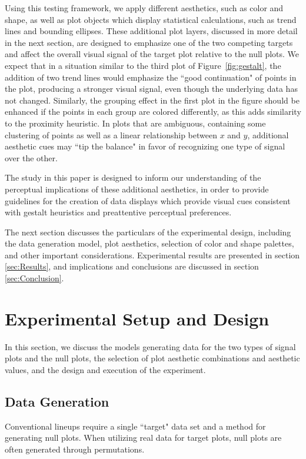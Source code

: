\documentclass[12pt]{article}\usepackage[]{graphicx}\usepackage[]{color}
\begin{document}
Using this testing framework, we  apply different aesthetics, such as color and shape, as well as plot objects which display statistical calculations, such as trend lines and bounding ellipses. These additional plot layers, discussed in more detail in the next section, are designed to emphasize one of the two competing targets and affect the overall visual signal of the target plot relative to the null plots. We expect that in a situation similar to the third plot of Figure~\ref{fig:gestalt}, the addition of two trend lines would emphasize the ``good continuation" of points in the plot, producing a stronger visual signal, even though the underlying data has not changed. Similarly, the grouping effect in the first plot in the figure should be enhanced if the points in each group are colored differently, as this adds similarity to the proximity heuristic. In plots that are ambiguous, containing some clustering of points as well as a linear relationship between $x$ and $y$, additional aesthetic cues may ``tip the balance" in favor of recognizing one type of signal over the other.

The study in this paper is designed to inform our understanding of the perceptual implications of these additional aesthetics, in order to provide guidelines for the creation of data displays which provide visual cues consistent with gestalt heuristics and preattentive perceptual preferences. 

The next section discusses the particulars of the experimental design, including the data generation model, plot aesthetics, selection of color and shape palettes, and other important considerations. Experimental results are presented in section \ref{sec:Results}, and implications and conclusions are discussed in section \ref{sec:Conclusion}. 

\section{Experimental Setup and Design} \label{sec:ExperimentalDesign}
In this section, we discuss the models generating data for the two types of signal plots and the null plots, the selection of plot aesthetic combinations and aesthetic values, and the design and execution of the experiment.

\subsection{Data Generation}
Conventional lineups require a single ``target" data set %
and a method for generating null plots. When utilizing real data for target plots, null plots are often generated through permutations.
\end{document}
